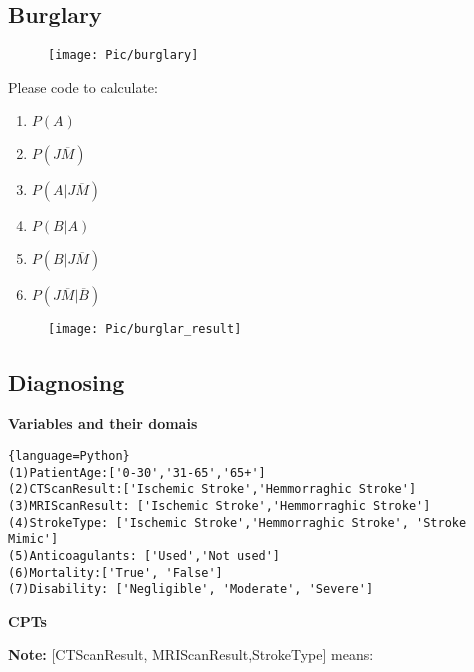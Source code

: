 ﻿\documentclass[a4paper, 11pt]{article}
\begin{document}
\subsection{Burglary}
\label{sec:burglary}
\begin{figure}[h]
  \centering

  \texttt{[image: Pic/burglary]}
\end{figure}
Please code to calculate:
\begin{enumerate}
\item $P(A)$
\item $P(J\overline{M})$
\item $P(A | J\overline{M})$
\item $P(B | A)$
  \item $P(B | J\overline{M})$
  \item  $P(J\overline{M} | \overline{B})$
\end{enumerate}
\begin{figure}[ht]
\centering
\texttt{[image: Pic/burglar\_result]}
\end{figure}
\subsection{Diagnosing}
\label{sec:bayesian-networks}
\textbf{Variables and their domais}
\begin{lstlisting}{language=Python}
(1)PatientAge:['0-30','31-65','65+']
(2)CTScanResult:['Ischemic Stroke','Hemmorraghic Stroke']
(3)MRIScanResult: ['Ischemic Stroke','Hemmorraghic Stroke']
(4)StrokeType: ['Ischemic Stroke','Hemmorraghic Stroke', 'Stroke Mimic']
(5)Anticoagulants: ['Used','Not used']
(6)Mortality:['True', 'False']
(7)Disability: ['Negligible', 'Moderate', 'Severe']
\end{lstlisting}
\textbf{CPTs}

\textbf{Note:} [CTScanResult, MRIScanResult,StrokeType] means:
\end{document}
